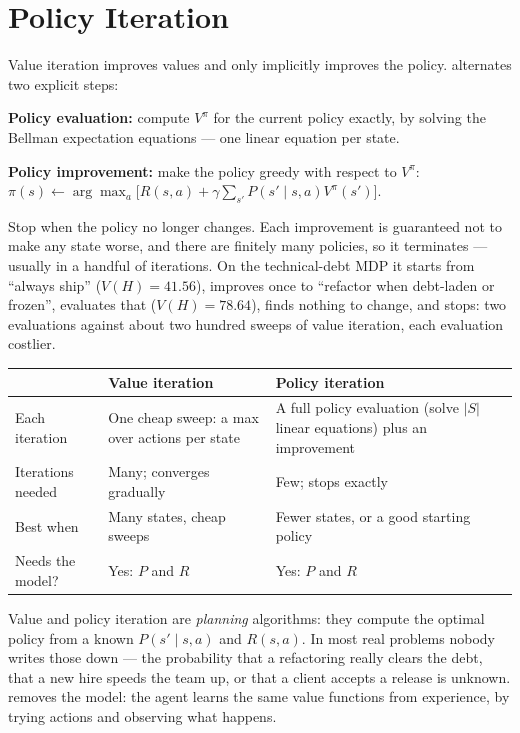 \section{Policy Iteration}

Value iteration improves values and only implicitly improves the policy.  alternates two explicit steps:
\begin{tightnum}
  \item \textbf{Policy evaluation:} compute $V^{\pi}$ for the current policy exactly,
        by solving the Bellman expectation equations --- one linear equation per
        state.
  \item \textbf{Policy improvement:} make the policy greedy with respect to $V^{\pi}$:
        $\pi(s) \leftarrow \arg\max_a\big[R(s, a) + \gamma\sum_{s'}P(s' \mid s, a)V^{\pi}(s')\big]$.
\end{tightnum}
Stop when the policy no longer changes. Each improvement is guaranteed not to make any
state worse, and there are finitely many policies, so it terminates --- usually in a
handful of iterations. On the technical-debt MDP it starts from ``always ship''
($V(H) = 41.56$), improves once to ``refactor when debt-laden or frozen'', evaluates
that ($V(H) = 78.64$), finds nothing to change, and stops: two evaluations against about
two hundred sweeps of value iteration, each evaluation costlier.

\begin{longtable}{@{}L{3.0cm}L{6.0cm}L{6.0cm}@{}}
\toprule
{}
\textbf{} & \textbf{Value iteration} & \textbf{Policy iteration} \\
\midrule
\endhead
Each iteration & One cheap sweep: a max over actions per state & A full policy
evaluation (solve $|S|$ linear equations) plus an improvement \\
Iterations needed & Many; converges gradually & Few; stops exactly \\
Best when & Many states, cheap sweeps & Fewer states, or a good starting policy \\
Needs the model? & Yes: $P$ and $R$ & Yes: $P$ and $R$ \\
\bottomrule
\end{longtable}

\begin{alertbox}
Value and policy iteration are \emph{planning} algorithms: they compute the optimal
policy from a known $P(s' \mid s, a)$ and $R(s, a)$. In most real problems nobody
writes those down --- the probability that a refactoring really clears the debt, that
a new hire speeds the team up, or that a client accepts a release is unknown.  removes the model: the agent learns the
same value functions from experience, by trying actions and observing what happens.
\end{alertbox}

